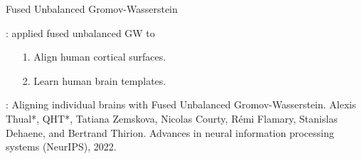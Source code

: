 \documentclass{beamer}
\begin{document}
\begin{frame}{Fused Unbalanced Gromov-Wasserstein}
  \scriptsize


  \vspace{5cm}
  {}: applied fused unbalanced GW to
  \begin{enumerate}
    \setlength\itemindent{10pt}
    \item[1.] Align human cortical surfaces.
    \item[2.] Learn human brain templates.
  \end{enumerate}

  \vspace{0.3cm}
  {}: Aligning individual brains with Fused Unbalanced Gromov-Wasserstein.
  Alexis Thual*, QHT*, Tatiana Zemskova, Nicolas Courty,
  Rémi Flamary, Stanislas Dehaene, and Bertrand Thirion.
  Advances in neural information processing systems (NeurIPS), 2022.

\end{frame}
\end{document}
